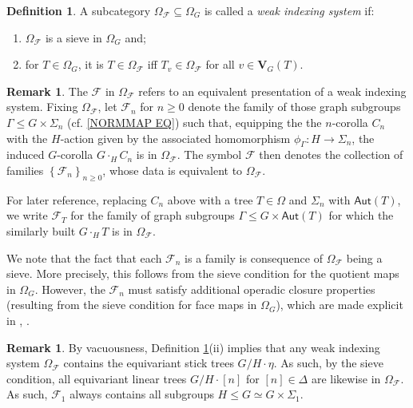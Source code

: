 \documentclass[a4paper,10pt
,draft
]{article}%
\numberwithin{equation}{section}
\numberwithin{figure}{section}
\theoremstyle{definition} %
\newtheorem{definition}[equation]{Definition}%
\newtheorem{remark}[equation]{Remark}%
\newcommand{\set}[1]{\left\{#1\right\}}%
\newcommand{\F}{\ensuremath{\mathcal F}}
\newcommand{\1}{\ensuremath{\mathbbm 1}}%
\begin{document}
\begin{definition}
      \label{WIS_DEF}
      A subcategory $\Omega_\F \subseteq \Omega_G$ is called a \textit{weak indexing system} if:
      \begin{enumerate}
      \item $\Omega_\F$ is a sieve in $\Omega_G$ and;
      \item for $T \in \Omega_G$, 
      it is $T \in \Omega_\F$ iff $T_v \in \Omega_\F$ for all $v \in \boldsymbol{V}_G(T)$.
      \end{enumerate}
\end{definition}


\begin{remark}\label{WIS_FAMILY_REM}
	The $\F$ in $\Omega_\F$ refers to an equivalent presentation of a weak indexing system.
%
	Fixing $\Omega_\F$, 
	let $\F_n$ for $n \geq 0$ denote the family of those
	graph subgroups $\Gamma \leq G \times \Sigma_n$
	(cf. \eqref{NORMMAP EQ}) such that,
	equipping the the $n$-corolla $C_n$
	with the $H$-action given by the associated homomorphism
	$\phi_{\Gamma} \colon H \to \Sigma_n$,
	the induced $G$-corolla $G \cdot_H C_n$ is in $\Omega_\F$.
	The symbol $\F$ then denotes the collection of families $\set{\F_n}_{n \geq 0}$, whose data is equivalent to $\Omega_{\F}$.
	
	For later reference,
	replacing $C_n$ above with a tree $T\in \Omega$
	and $\Sigma_n$ with $\mathsf{Aut}(T)$,
	we write
	$\F_T$ for the family of graph subgroups
	$\Gamma \leq G \times \mathsf{Aut}(T)$ for which the similarly built $G\cdot_H T$ is in $\Omega_{\F}$.
	
	We note that the fact that each $\F_n$ is a family is consequence of $\Omega_\F$ being a sieve. More precisely, this follows from the sieve condition for the quotient maps in $\Omega_G$. 
	However, the $\F_n$ must satisfy additional operadic closure properties
	(resulting from the sieve condition for face maps in $\Omega_G$),
	which are made explicit in 
	\cite[Def. 3.22]{BH15}, \cite[Def. 2.12]{Rub_nf}.
%
\end{remark}

\begin{remark}\label{ETAF_REM}
	By vacuousness, Definition \ref{WIS_DEF}(ii) 
	implies that any weak indexing system $\Omega_\F$
	contains the equivariant stick trees
	$G/H \cdot \eta$.
	As such, by the sieve condition, 
	all equivariant linear trees
	$G/H \cdot [n]$ for $[n] \in \Delta$
	are likewise in $\Omega_\F$.
	As such, $\F_1$ always contains all subgroups
	$H \leq G \simeq G \times \Sigma_1$.
\end{remark}
\end{document}
